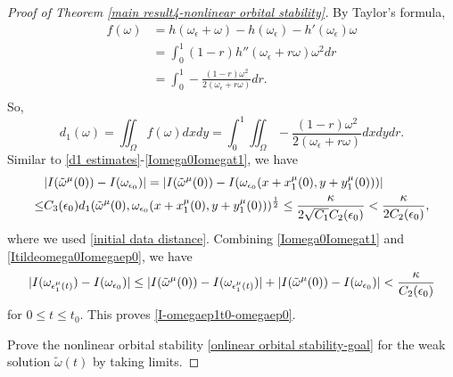 \documentclass[1 [leqno, 11pt]{amsart}
\numberwithin{equation}{section}
\let\ep=\epsilon
\begin{document}
\begin{CJK*}{GBK}{song}
\begin{proof}[Proof of  Theorem \ref{main result4-nonlinear orbital stability}]
By Taylor's formula,
\begin{align*}
f(\omega) &= h(\omega_\ep + \omega) - h(\omega_\ep) - h'(\omega_\ep) \omega \\
& = \int_0^1 (1-r) h''(\omega_\ep + r\omega) \omega^2 dr\\
& = \int_0^1 -\frac{(1-r)  \omega^2}{2(\omega_\ep + r\omega)} dr.\\
\end{align*}
So,
$$d_1(\omega) = \iint_\Omega f(\omega) dxdy = \int_0^1 \iint_\Omega -\frac{(1-r)  \omega^2}{2(\omega_\ep + r\omega)} dxdydr.$$
\fi
Similar to \eqref{d1 estimates}-\eqref{Iomega0Iomegat1}, we have
\begin{align}\nonumber
&|I(\tilde \omega^\mu(0))-I(\omega_{\ep_0})|=|I(\tilde \omega^\mu(0))-I(\omega_{\ep_0}(x+x_1^\mu(0),y+y_1^\mu(0)))|\\\label{Itildeomega0Iomegaep0}
\leq& C_3(\ep_0)d_1(\tilde \omega^\mu(0),\omega_{\ep_0}(x+x_1^\mu(0),y+y_1^\mu(0)))^{1\over2}
\leq {\kappa\over2\sqrt{C_1}C_2(\ep_0)}< {\kappa\over2C_2(\ep_0)},
\end{align}
where we used \eqref{initial data distance}.
Combining \eqref{Iomega0Iomegat1} and \eqref{Itildeomega0Iomegaep0}, we have
\begin{align*}
|I(\omega_{\ep_1^\mu(t)})-I(\omega_{\ep_0})|\leq |I(\tilde \omega^\mu(0))-I(\omega_{\ep_1^\mu(t)})|+|I(\tilde \omega^\mu(0))-I(\omega_{\ep_0})|
<{\kappa\over C_2(\ep_0)}
\end{align*}
for $0\leq t\leq t_0$.
This proves \eqref{I-omegaep1t0-omegaep0}.

\vspace{0.5mm}

 Prove the nonlinear orbital stability \eqref{onlinear orbital stability-goal} for the weak solution $\tilde \omega(t)$ by taking limits.


\end{proof}
\end{CJK*}
\end{document}
